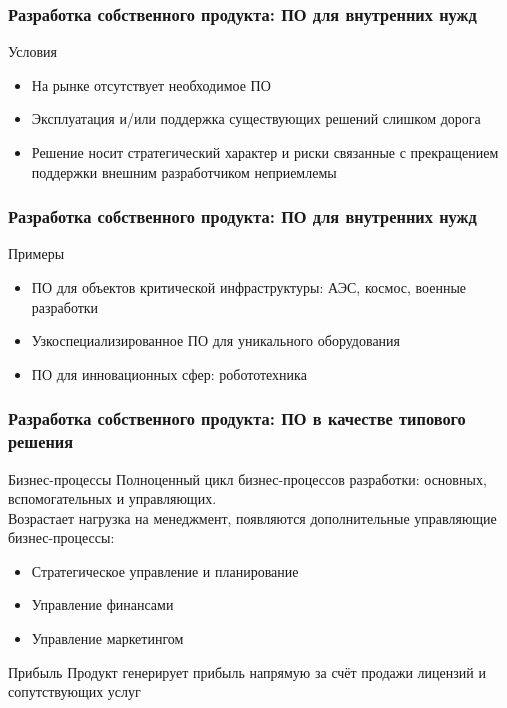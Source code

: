 \documentclass{../industrial-development}
\begin{document}
\begin{frame} \frametitle{Разработка собственного продукта: ПО для внутренних нужд}
	\begin{block}{Условия}
		\begin{itemize}
			\item На рынке отсутствует необходимое ПО
			\item Эксплуатация и/или поддержка существующих решений слишком дорога
			\item Решение носит стратегический характер и риски связанные с прекращением поддержки внешним разработчиком неприемлемы
		\end{itemize}
	\end{block}
\end{frame}


\begin{frame} \frametitle{Разработка собственного продукта: ПО для внутренних нужд}
	\begin{block}{Примеры}
		\begin{itemize}
			\item ПО для объектов критической инфраструктуры: АЭС, космос, военные разработки
			\item Узкоспециализированное ПО для уникального оборудования
			\item ПО для инновационных сфер: робототехника
		\end{itemize}
	\end{block}
\end{frame}


\begin{frame} \frametitle{Разработка собственного продукта: ПО в качестве типового решения}
	\begin{block}{Бизнес-процессы}
		Полноценный цикл бизнес-процессов разработки: основных, вспомогательных и управляющих.\\
		Возрастает нагрузка на менеджмент, появляются дополнительные управляющие бизнес-процессы:
		\begin{itemize}
			\item Стратегическое управление и планирование
			\item Управление финансами
			\item Управление маркетингом
		\end{itemize}
	\end{block}
	\begin{block}{Прибыль}
		Продукт генерирует прибыль напрямую за счёт продажи лицензий и сопутствующих услуг
	\end{block}
\end{frame}
\end{document}
